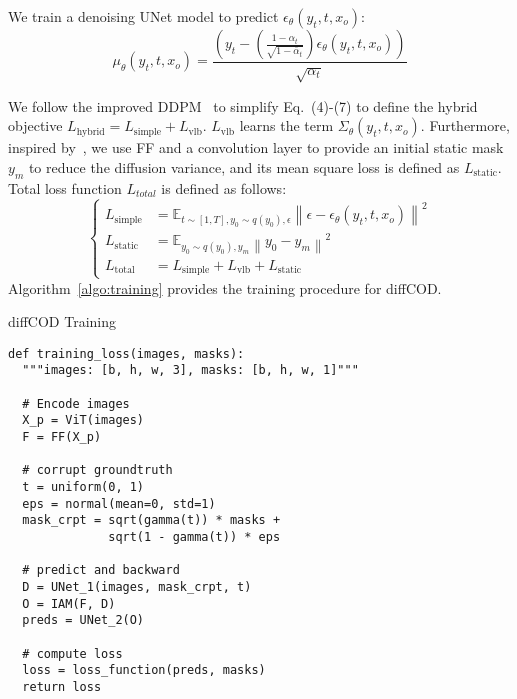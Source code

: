 \documentclass{ecai}
\begin{document}
We train a denoising UNet model to predict ${\epsilon}_\theta\left({y}_t, t, {x}_o\right)$:
\begin{equation}
    \mu_\theta\left(y_t, t,x_{o}\right)=\frac{\left(y_t-\left(\frac{1-\alpha_t}{\sqrt{1-\bar{\alpha}_t}}\right) \epsilon_\theta\left(y_t, t,x_{o}\right)\right)}{\sqrt{\alpha_t}}  
\end{equation}

We follow the improved DDPM~\cite{nichol2021improved} to simplify Eq.~(4)-(7) to define the hybrid objective $L_{\mathrm{hybrid}}=L_{\mathrm{simple}}+ L_{\mathrm{vlb}}$. $L_{\mathrm{vlb}}$ learns the term $\Sigma_\theta\left(y_t, t,x_o\right)$. Furthermore, inspired by~\cite{wu2023medsegdiff}, we use FF and a convolution layer to provide an initial static mask $y_{m}$ to reduce the diffusion variance, and its mean square loss is defined as $L_{\mathrm{static}}$. Total loss function $L_{total}$ is defined as follows:
\begin{equation}
\left\{
\begin{array}{ll}
L_{\mathrm{simple}} &=\mathbb{E}_{t \sim[1, T], y_0 \sim q\left(y_0\right), \epsilon}\left\|\epsilon-\epsilon_\theta\left(y_t, t, x_o \right)\right\|^2 \\
L_{\mathrm{static}} &=\mathbb{E}_{y_0 \sim q\left(y_0\right), y_m}\left\|y_{0} - y_m\right\|^2 \\
L_{\mathrm{total}} &=L_{\mathrm{simple}}+ L_{\mathrm{vlb}}+L_{\mathrm{static}}
\end{array}
\right.
\end{equation}
Algorithm~\ref{algo:training} provides the training procedure for diffCOD.

\begin{algorithm}[ht]
\caption{diffCOD Training}
\label{algo:training}
\lstset{language=Python}
\begin{lstlisting}[xleftmargin=-1em]
def training_loss(images, masks):
  """images: [b, h, w, 3], masks: [b, h, w, 1]"""

  # Encode images
  X_p = ViT(images) 
  F = FF(X_p) 
    
  # corrupt groundtruth
  t = uniform(0, 1)
  eps = normal(mean=0, std=1)
  mask_crpt = sqrt(gamma(t)) * masks +
              sqrt(1 - gamma(t)) * eps

  # predict and backward
  D = UNet_1(images, mask_crpt, t)
  O = IAM(F, D)
  preds = UNet_2(O)

  # compute loss
  loss = loss_function(preds, masks)
  return loss
\end{lstlisting}
\end{algorithm}
\end{document}
